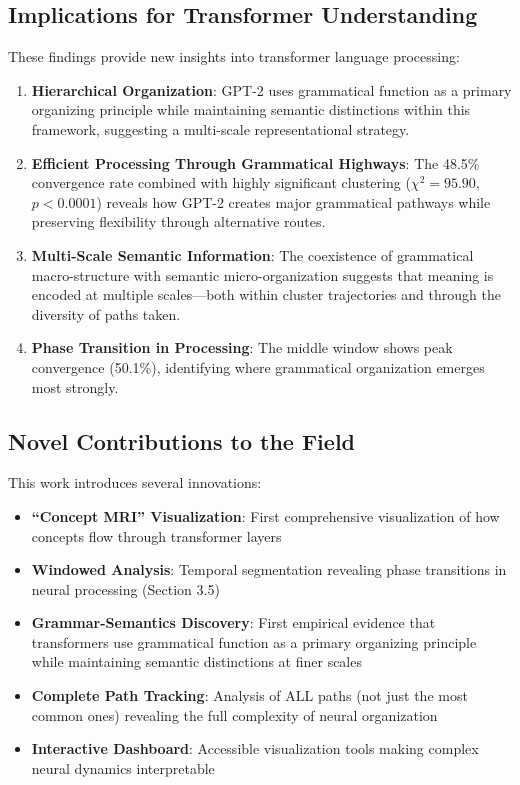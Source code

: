 \subsection{Implications for Transformer Understanding}

These findings provide new insights into transformer language processing:

\begin{enumerate}
    \item \textbf{Hierarchical Organization}: GPT-2 uses grammatical function as a primary organizing principle while maintaining semantic distinctions within this framework, suggesting a multi-scale representational strategy.
    
    \item \textbf{Efficient Processing Through Grammatical Highways}: The 48.5\% convergence rate combined with highly significant clustering ($\chi^2 = 95.90$, $p < 0.0001$) reveals how GPT-2 creates major grammatical pathways while preserving flexibility through alternative routes.
    
    \item \textbf{Multi-Scale Semantic Information}: The coexistence of grammatical macro-structure with semantic micro-organization suggests that meaning is encoded at multiple scales—both within cluster trajectories and through the diversity of paths taken.
    
    \item \textbf{Phase Transition in Processing}: The middle window shows peak convergence (50.1\%), identifying where grammatical organization emerges most strongly.
\end{enumerate}

\subsection{Novel Contributions to the Field}

This work introduces several innovations:

\begin{itemize}
    \item \textbf{``Concept MRI'' Visualization}: First comprehensive visualization of how concepts flow through transformer layers
    \item \textbf{Windowed Analysis}: Temporal segmentation revealing phase transitions in neural processing (Section 3.5)
    \item \textbf{Grammar-Semantics Discovery}: First empirical evidence that transformers use grammatical function as a primary organizing principle while maintaining semantic distinctions at finer scales
    \item \textbf{Complete Path Tracking}: Analysis of ALL paths (not just the most common ones) revealing the full complexity of neural organization
    \item \textbf{Interactive Dashboard}: Accessible visualization tools making complex neural dynamics interpretable
\end{itemize}

